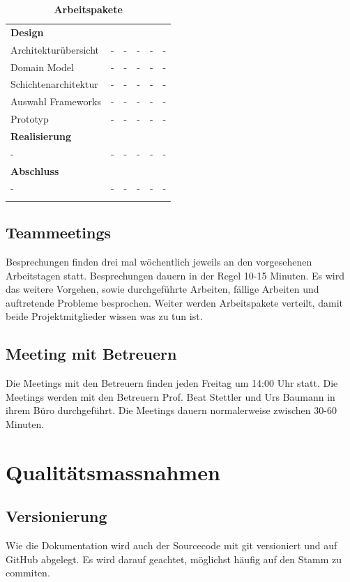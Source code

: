 \begin{landscape}
\begin{longtable}{ p{5.5cm} p{8cm} l l p{1cm} p{1cm} }
\textbf{Design}&&&&\\ \addlinespace
Architekturübersicht & - & - & - & - & -\\ \addlinespace
Domain Model & - & - & - & - & -\\ \addlinespace
Schichtenarchitektur & - & - & - & - & -\\ \addlinespace
Auswahl Frameworks & - & - & - & - & -\\ \addlinespace
Prototyp & - & - & - & - & -\\ \addlinespace

\textbf{Realisierung}&&&&\\ \addlinespace
- & - & - & - & - & -\\ \addlinespace
\textbf{Abschluss}&&&&\\ \addlinespace
- & - & - & - & - & -\\ \addlinespace


\addlinespace


\hline\caption{\textbf{Arbeitspakete}}
\end{longtable}
\end{landscape}

\subsection{Teammeetings}
Besprechungen finden drei mal wöchentlich jeweils an den vorgesehenen Arbeitstagen statt. 
Besprechungen dauern in der Regel 10-15 Minuten. Es wird das weitere Vorgehen, sowie durchgeführte Arbeiten, fällige Arbeiten und auftretende Probleme besprochen. Weiter werden Arbeitspakete verteilt, damit beide Projektmitglieder wissen was zu tun ist. 

\subsection{Meeting mit Betreuern}
Die Meetings mit den Betreuern finden jeden Freitag um 14:00 Uhr statt. 
Die Meetings werden mit den Betreuern Prof. Beat Stettler und Urs Baumann in ihrem Büro durchgeführt. Die Meetings dauern normalerweise zwischen 30-60 Minuten. 

\section{Qualitätsmassnahmen}
\subsection{Versionierung}
Wie die Dokumentation wird auch der Sourcecode mit git versioniert und auf GitHub abgelegt. Es wird darauf geachtet, möglichst häufig auf den Stamm zu commiten.
